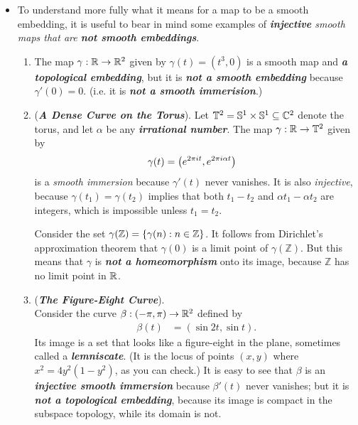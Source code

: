 \documentclass[11pt]{article}
\begin{document}
\begin{itemize}
\item \begin{remark}
To understand more fully what it means for a map to be a smooth embedding, it is useful to bear in mind some examples of \emph{\textbf{injective} smooth maps that are \textbf{not smooth embeddings}}. 
\begin{enumerate}
\item \begin{example}
The map $\gamma: {\mathbb R} \rightarrow {\mathbb R}^2$ given by $\gamma(t) = (t^3, 0)$ is a smooth map and \emph{\textbf{a topological embedding}}, but it is \emph{\textbf{not a smooth embedding}} because $\gamma'(0) = 0$. (i.e. it is \emph{\textbf{not a smooth immerision}}.)
\end{example}

\item \begin{example} (\emph{\textbf{A Dense Curve on the Torus}}). Let $\mathbb{T}^2  = {\mathbb S}^1 \times {\mathbb S}^1 \subseteq {\mathbb C}^2$ denote the torus, and let $\alpha$ be any \emph{\textbf{irrational number}}. The map $\gamma: {\mathbb R} \rightarrow \mathbb{T}^2$ given by
\begin{align*}
\gamma(t) &= \left(e^{2\pi i t}, e^{2\pi i \alpha t}\right) 
\end{align*} is a \emph{smooth immersion} because $\gamma'(t)$ never vanishes. It is also \emph{injective}, because $\gamma(t_1) = \gamma(t_2)$ implies that both $t_1 - t_2$ and  $\alpha t_1 - \alpha t_2$ are integers, which is impossible unless $t_1 = t_2$.

Consider the set $\gamma(\mathbb{Z}) = \left\{\gamma(n): n \in \mathbb{Z}\right\}$. It follows from Dirichlet’s approximation theorem that $\gamma(0)$ is a limit point of $\gamma(\mathbb{Z})$. But this means that $\gamma$ is \emph{\textbf{not a homeomorphism}} onto its image, because $\mathbb{Z}$ has no limit point in ${\mathbb R}$. 
\end{example}

\item \begin{example} (\emph{\textbf{The Figure-Eight Curve}}). \\ 
Consider the curve  $\beta: (-\pi, \pi) \rightarrow {\mathbb R}^2$ defined by
\begin{align*}
\beta(t) &= (\sin 2t,  \sin t).
\end{align*} Its image is a set that looks like a figure-eight in the plane, sometimes called a \emph{\textbf{lemniscate}}. (It is the locus of points $(x,y)$ where $x^2 =4y^2(1-y^2)$, as you can check.) It is easy to see that $\beta$ is an \emph{\textbf{injective smooth immersion}} because $\beta'(t)$ never vanishes; but it is \emph{\textbf{not a topological embedding}}, because its image is compact in the subspace topology, while its domain is not.
\end{example}
\end{enumerate}
\end{remark}



\end{itemize}
\end{document}
